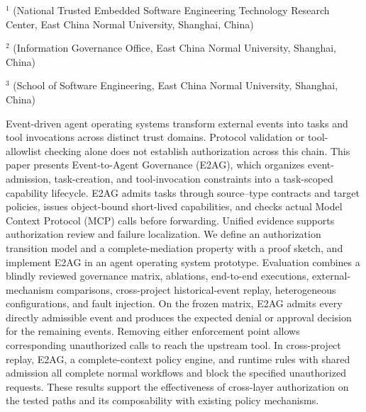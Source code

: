 \vspace{8pt}
\vspace{4pt}
\vspace{3pt}
\begingroup\fontsize{7.5pt}{10pt}\selectfont
\noindent$^{1}$ (National Trusted Embedded Software Engineering Technology Research Center, East China Normal University, Shanghai, China)\par
\noindent$^{2}$ (Information Governance Office, East China Normal University, Shanghai, China)\par
\noindent$^{3}$ (School of Software Engineering, East China Normal University, Shanghai, China)\par
\endgroup

\begin{josenabstract}
Event-driven agent operating systems transform external events into tasks and tool invocations across distinct trust domains. Protocol validation or tool-allowlist checking alone does not establish authorization across this chain. This paper presents Event-to-Agent Governance (E2AG), which organizes event-admission, task-creation, and tool-invocation constraints into a task-scoped capability lifecycle. E2AG admits tasks through source--type contracts and target policies, issues object-bound short-lived capabilities, and checks actual Model Context Protocol (MCP) calls before forwarding. Unified evidence supports authorization review and failure localization. We define an authorization transition model and a complete-mediation property with a proof sketch, and implement E2AG in an agent operating system prototype. Evaluation combines a blindly reviewed governance matrix, ablations, end-to-end executions, external-mechanism comparisons, cross-project historical-event replay, heterogeneous configurations, and fault injection. On the frozen matrix, E2AG admits every directly admissible event and produces the expected denial or approval decision for the remaining events. Removing either enforcement point allows corresponding unauthorized calls to reach the upstream tool. In cross-project replay, E2AG, a complete-context policy engine, and runtime rules with shared admission all complete normal workflows and block the specified unauthorized requests. These results support the effectiveness of cross-layer authorization on the tested paths and its composability with existing policy mechanisms.
\end{josenabstract}

\vspace{8pt}
